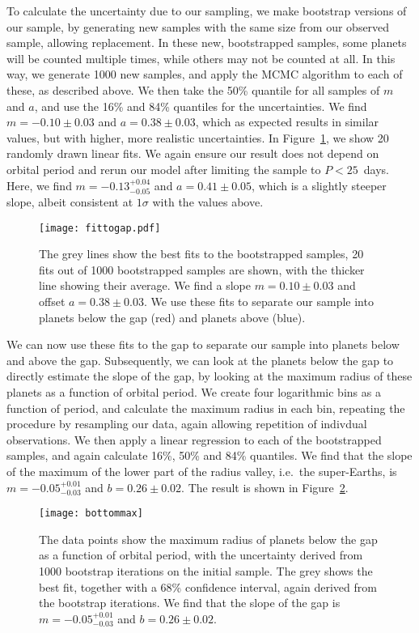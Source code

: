 \documentclass[a4paper,fleqn,usenatbib]{mnras}
\begin{document}
To calculate the uncertainty due to our sampling, we make bootstrap versions of our sample, by generating new samples with the same size from our observed sample, allowing replacement. In these new, bootstrapped samples, some planets will be counted multiple times, while others may not be counted at all. In this way, we generate 1000 new samples, and apply the MCMC algorithm to each of these, as described above. We then take the 50\% quantile for all samples of $m$ and $a$, and use the 16\% and 84\% quantiles for the uncertainties. We find $m = -0.10 \pm 0.03$ and $a = 0.38 \pm 0.03$, which as expected results in similar values, but with higher, more realistic uncertainties. In Figure~\ref{fig:gapfit}, we show 20 randomly drawn linear fits. 
%
We again ensure our result does not depend on orbital period and rerun our model after limiting the sample to $P < 25$~days. Here, we find $m = -0.13^{+0.04}_{-0.05}$ and $a = 0.41 \pm 0.05 $, which is a slightly steeper slope, albeit consistent at $1\sigma$ with the values above.

\begin{figure}
	\texttt{[image: fittogap.pdf]}
	\caption{The grey lines show the best fits to the bootstrapped samples, 20 fits out of 1000 bootstrapped samples are shown, with the thicker line showing their average. We find a slope $m = 0.10 \pm 0.03$ and offset $a = 0.38 \pm 0.03$. We use these fits to separate our sample into planets below the gap (red) and planets above (blue).}
	\label{fig:gapfit}
\end{figure}

We can now use these fits to the gap to separate our sample into planets below and above the gap. Subsequently, we can look at the planets below the gap to directly estimate the slope of the gap, by looking at the maximum radius of these planets as a function of orbital period. We create four logarithmic bins as a function of period, and calculate the maximum radius in each bin, repeating the procedure by resampling our data, again allowing repetition of indivdual observations. We then apply a linear regression to each of the bootstrapped samples, and again calculate 16\%, 50\% and 84\% quantiles. We find that the slope of the maximum of the lower part of the radius valley, i.e.\ the super-Earths, is $m = -0.05^{+0.01}_{-0.03}$ and $b = 0.26 \pm 0.02$. The result is shown in Figure~\ref{fig:maxfit}.


\begin{figure}
	\texttt{[image: bottommax]}
	\caption{The data points show the maximum radius of planets below the gap as a function of orbital period, with the uncertainty derived from 1000 bootstrap iterations on the initial sample. The grey shows the best fit, together with a 68\% confidence interval, again derived from the bootstrap iterations. We find that the slope of the gap is $m = -0.05^{+0.01}_{-0.03}$ and $b = 0.26 \pm 0.02$.}
	\label{fig:maxfit}
\end{figure}
\end{document}
